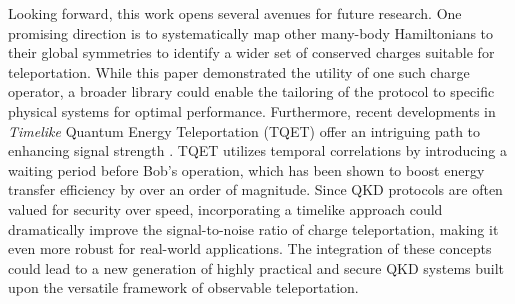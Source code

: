 Looking forward, this work opens several avenues for future research. One promising direction is to systematically map other many-body Hamiltonians to their global symmetries to identify a wider set of conserved charges suitable for teleportation. While this paper demonstrated the utility of one such charge operator, a broader library could enable the tailoring of the protocol to specific physical systems for optimal performance. Furthermore, recent developments in \textit{Timelike} Quantum Energy Teleportation (TQET) offer an intriguing path to enhancing signal strength \cite{Ikeda2025_TQET}. TQET utilizes temporal correlations by introducing a waiting period before Bob's operation, which has been shown to boost energy transfer efficiency by over an order of magnitude. Since QKD protocols are often valued for security over speed, incorporating a timelike approach could dramatically improve the signal-to-noise ratio of charge teleportation, making it even more robust for real-world applications. The integration of these concepts could lead to a new generation of highly practical and secure QKD systems built upon the versatile framework of observable teleportation.
